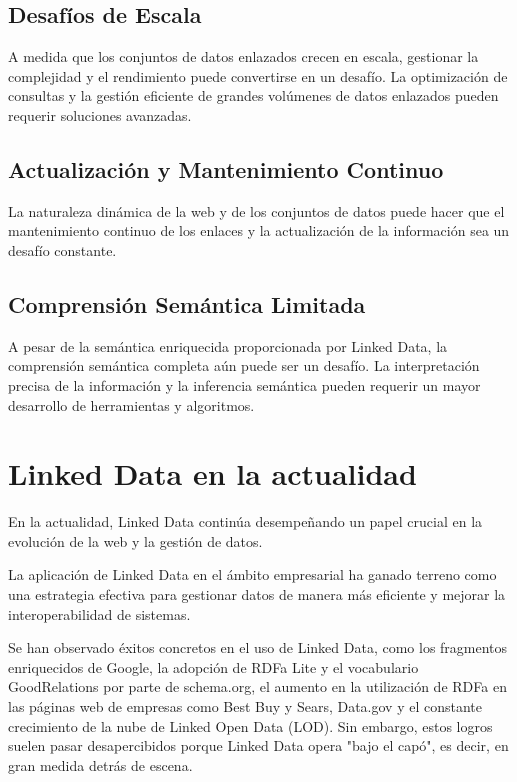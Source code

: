\documentclass[11pt]{report}
\begin{document}
\section{Desafíos de Escala}

		A medida que los conjuntos de datos enlazados crecen en escala, gestionar la complejidad y el rendimiento puede convertirse en un desafío. La optimización de consultas y la gestión eficiente de grandes volúmenes de datos enlazados pueden requerir soluciones avanzadas.
\section{Actualización y Mantenimiento Continuo}

		La naturaleza dinámica de la web y de los conjuntos de datos puede hacer que el mantenimiento continuo de los enlaces y la actualización de la información sea un desafío constante.
\section{Comprensión Semántica Limitada}

		A pesar de la semántica enriquecida proporcionada por Linked Data, la comprensión semántica completa aún puede ser un desafío. La interpretación precisa de la información y la inferencia semántica pueden requerir un mayor desarrollo de herramientas y algoritmos.

\chapter{Linked Data en la actualidad}
En la actualidad, Linked Data continúa desempeñando un papel crucial en la evolución de la web y la gestión de datos.

La aplicación de Linked Data en el ámbito empresarial ha ganado terreno como una estrategia efectiva para gestionar datos de manera más eficiente y mejorar la interoperabilidad de sistemas.

Se han observado éxitos concretos en el uso de Linked Data, como los fragmentos enriquecidos de Google, la adopción de RDFa Lite y el vocabulario GoodRelations por parte de schema.org, el aumento en la utilización de RDFa en las páginas web de empresas como Best Buy y Sears, Data.gov y el constante crecimiento de la nube de Linked Open Data (LOD). Sin embargo, estos logros suelen pasar desapercibidos porque Linked Data opera "bajo el capó", es decir, en gran medida detrás de escena.
\end{document}
